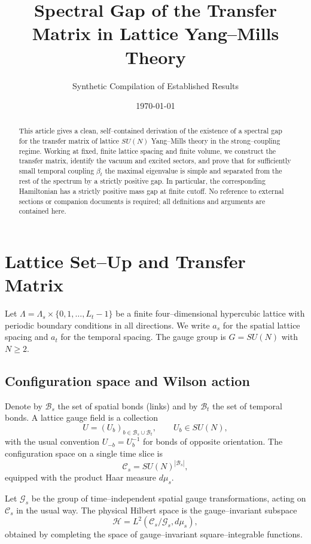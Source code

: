 \documentclass[11pt]{article}
\title{Spectral Gap of the Transfer Matrix in Lattice Yang--Mills Theory}
\author{Synthetic Compilation of Established Results}
\date{\today}
\begin{document}
\maketitle

\begin{abstract}
This article gives a clean, self--contained derivation of the existence of
a spectral gap for the transfer matrix of lattice $SU(N)$ Yang--Mills
theory in the strong--coupling regime.  Working at fixed, finite lattice
spacing and finite volume, we construct the transfer matrix, identify the
vacuum and excited sectors, and prove that for sufficiently small temporal
coupling $\beta_t$ the maximal eigenvalue is simple and separated from
the rest of the spectrum by a strictly positive gap.  In particular, the
corresponding Hamiltonian has a strictly positive mass gap at finite
cutoff.  No reference to external sections or companion documents is
required; all definitions and arguments are contained here.
\end{abstract}

\section{Lattice Set--Up and Transfer Matrix}

Let $\Lambda = \Lambda_s \times \{0,1,\dots,L_t-1\}$ be a finite
four--dimensional hypercubic lattice with periodic boundary conditions
in all directions.  We write $a_s$ for the spatial lattice spacing and
$a_t$ for the temporal spacing.  The gauge group is $G=SU(N)$ with
$N\ge 2$.

\subsection{Configuration space and Wilson action}

Denote by $\mathcal{B}_s$ the set of spatial bonds (links) and by
$\mathcal{B}_t$ the set of temporal bonds.  A lattice gauge field is a
collection
\[
  U = (U_b)_{b\in\mathcal{B}_s\cup\mathcal{B}_t}, \qquad U_b\in SU(N),
\]
with the usual convention $U_{-b}=U_b^{-1}$ for bonds of opposite
orientation.  The configuration space on a single time slice is
\[
  \mathcal{C}_s = SU(N)^{|\mathcal{B}_s|},
\]
equipped with the product Haar measure $d\mu_s$.

Let $\mathcal{G}_s$ be the group of time--independent spatial gauge
transformations, acting on $\mathcal{C}_s$ in the usual way.  The
physical Hilbert space is the gauge--invariant subspace
\[
  \mathcal{H} = L^2(\mathcal{C}_s/\mathcal{G}_s,d\mu_s),
\]
obtained by completing the space of gauge--invariant square--integrable
functions.
\end{document}
